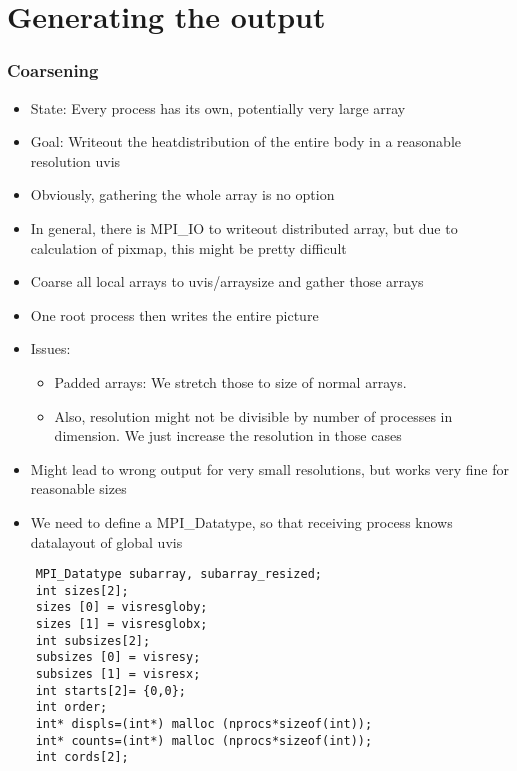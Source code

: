 \section{Generating the output}
\begin{frame}
  \frametitle{Coarsening}
  \begin{itemize}
  \item State: Every process has its own, potentially very large array
  \item Goal: Writeout the heatdistribution of the entire body in a reasonable resolution uvis
  \item Obviously, gathering the whole array is no option
  \item In general, there is MPI\_IO to writeout distributed array, but due to calculation of pixmap, this might be pretty difficult
  \end{itemize}
\end{frame}

\begin{frame}
  \begin{itemize}
  \item Coarse all local arrays to uvis/arraysize and gather those arrays
  \item One root process then writes the entire picture
  \item Issues:
    \begin{itemize}
    \item Padded arrays: We stretch those to size of normal arrays.
    \item Also, resolution might not be divisible by number of processes in dimension. We just increase the resolution in those cases
    \end{itemize}
  \item Might lead to wrong output for very small resolutions, but works very fine for reasonable sizes
  \item We need to define a MPI\_Datatype, so that receiving process knows datalayout of global uvis
  \end{itemize}
\end{frame}

\begin{frame}[fragile]
  \begin{lstlisting}
    MPI_Datatype subarray, subarray_resized;
    int sizes[2];
    sizes [0] = visresgloby;
    sizes [1] = visresglobx;
    int subsizes[2];
    subsizes [0] = visresy;
    subsizes [1] = visresx;
    int starts[2]= {0,0};
    int order;
    int* displs=(int*) malloc (nprocs*sizeof(int));
    int* counts=(int*) malloc (nprocs*sizeof(int));
    int cords[2];
  \end{lstlisting}
\end{frame}



